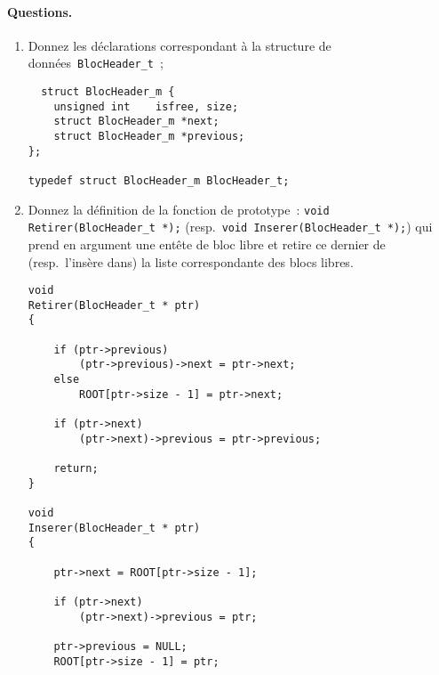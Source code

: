 \paragraph{Questions.}
\begin{enumerate}
\item Donnez les d\'eclarations correspondant \`a la structure de
  donn\'ees~\verb+BlocHeader_t+~;
\ifcorrection
\begin{correction}
\begin{verbatim}
  struct BlocHeader_m {
	unsigned int    isfree, size;
	struct BlocHeader_m *next;
	struct BlocHeader_m *previous;
};

typedef struct BlocHeader_m BlocHeader_t;
\end{verbatim}
\end{correction}
\fi
\item Donnez la d\'efinition de la fonction de prototype~: %
\verb+void Retirer(BlocHeader_t *);+ %
(resp.\ \verb+void Inserer(BlocHeader_t *);+) qui prend en argument
une ent\^ete de bloc libre et retire ce dernier de (resp.\ l'ins\`ere
dans)  la liste correspondante des blocs libres.
\ifcorrection
\begin{correction}
\newpage
\begin{verbatim}
void
Retirer(BlocHeader_t * ptr)
{

	if (ptr->previous)
		(ptr->previous)->next = ptr->next;
	else
		ROOT[ptr->size - 1] = ptr->next;

	if (ptr->next)
		(ptr->next)->previous = ptr->previous;

	return;
}

void
Inserer(BlocHeader_t * ptr)
{

	ptr->next = ROOT[ptr->size - 1];

	if (ptr->next)
		(ptr->next)->previous = ptr;

	ptr->previous = NULL;
	ROOT[ptr->size - 1] = ptr;


\end{verbatim}
\end{correction}
\end{enumerate}
